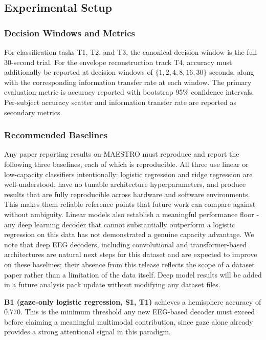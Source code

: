 \documentclass{article}
\begin{document}
\subsection{Experimental Setup}\label{sec:protocol}

\subsubsection{Decision Windows and Metrics}
For classification tasks T1, T2, and T3, the canonical decision window is 
the full 30-second trial. For the envelope reconstruction track T4, accuracy 
must additionally be reported at decision windows of $\{1, 2, 4, 8, 16, 30\}$ 
seconds, along with the corresponding information transfer rate at each window. 
The primary evaluation metric is accuracy reported with bootstrap 95\% 
confidence intervals. Per-subject accuracy scatter and information transfer 
rate are reported as secondary metrics.

\subsubsection{Recommended Baselines}
Any paper reporting results on MAESTRO must reproduce and report the following 
three baselines, each of which is reproducible. All three use linear or low-capacity classifiers intentionally: logistic regression and ridge regression are well-understood, have no tunable architecture hyperparameters, and produce results that are
fully reproducible across hardware and software environments. This makes them reliable reference points that future work can compare against without ambiguity. Linear models also establish a meaningful performance floor - any deep learning decoder that cannot substantially outperform a logistic regression on this data has not demonstrated a genuine capacity advantage. We note that deep EEG decoders, including convolutional and transformer-based
architectures are natural next steps for this dataset and are expected to improve on these baselines; their absence from this release reflects the scope of a dataset paper rather than a limitation of the data itself. Deep model results will be added in a future analysis pack update without modifying any dataset files.

\textbf{B1 (gaze-only logistic regression, S1, T1)} achieves a hemisphere 
accuracy of 0.770. This is the minimum threshold any new EEG-based decoder 
must exceed before claiming a meaningful multimodal contribution, since gaze 
alone already provides a strong attentional signal in this paradigm.
\end{document}
